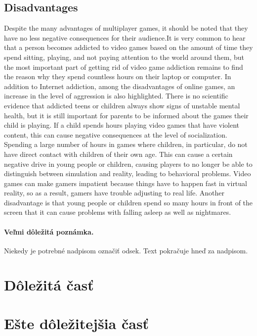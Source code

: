 \documentclass[10pt,twoside,slovak,a4paper]{article}
\begin{document}
\subsection{Disadvantages} \label{ina:este}

  Despite the many advantages of multiplayer games, it should be noted that they have no less negative consequences for their audience.It is very common to hear that a person becomes addicted to video games based on the amount of time they spend sitting, playing, and not paying attention to the world around them, but the most important part of getting rid of video game addiction remains to find the reason why they spend countless hours on their laptop or computer. In addition to Internet addiction, among the disadvantages of online games, an increase in the level of aggression is also highlighted. There is no scientific evidence that addicted teens or children always show signs of unstable mental health, but it is still important for parents to be informed about the games their child is playing. If a child spends hours playing video games that have violent content, this can cause negative consequences at the level of socialization. Spending a large number of hours in games where children, in particular, do not have direct contact with children of their own age. This can cause a certain negative drive in young people or children, causing players to no longer be able to distinguish between simulation and reality, leading to behavioral problems. Video games can make gamers impatient because things have to happen fast in virtual reality, so as a result,  gamers have trouble adjusting to real life. Another disadvantage is that young people or children spend so many hours in front of the screen that it can cause problems with falling asleep as well as nightmares.

\paragraph{Veľmi dôležitá poznámka.}
Niekedy je potrebné nadpisom označiť odsek. Text pokračuje hneď za nadpisom.



\section{Dôležitá časť} \label{dolezita}




\section{Ešte dôležitejšia časť} \label{dolezitejsia}
\end{document}

